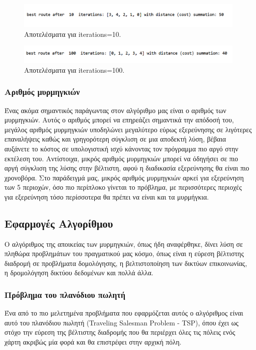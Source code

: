 \begin{figure}
    \centering
    \includegraphics[scale=0.55]{2947_thesis/pictures/ex5.png} 
    \caption{Αποτελέσματα για iterations=10.}
    \label{iter10}

\end{figure}
\begin{figure}
    \centering
    \includegraphics[scale=0.55]{2947_thesis/pictures/ex6.png} 
    \caption{Αποτελέσματα για iterations=100.}
    \label{iter100}
\end{figure}


\subsubsection{Αριθμός μυρμηγκιών}
Ένας ακόμα σημαντικός παράγωντας στον αλγόριθμο μας είναι ο αριθμός των μυρμηγκιών. Αυτός ο αριθμός μπορεί να επηρεάζει σημαντικά την απόδοσή του, μεγάλος αριθμός μυρμηγκιών υποδηλώνει μεγαλύτερο εύρως εξερεύνησης σε λιγότερες επαναλήψεις καθώς και γρηγορότερη σύγκλιση σε μια αποδεκτή λύση, βέβαια αυξάνετε το κόστος σε υπολογιστική ισχύ κάνοντας τον πρόγραμμα πιο αργό στην εκτέλεση του. Αντίστοιχα, μικρός αριθμός μυρμηγκιών μπορεί να όδηγήσει σε πιο αργή σύγκλιση της λύσης στην βέλτιστη, αφού η διαδικασία εξερεύνησης θα είναι πιο χρονοβόρα. Στο παράδειγμά μας, μικρός αριθμός μυρμηγκιών αρκεί για εξερεύνηση των 5 περιοχών, όσο πιο περίπλοκο γίνεται το πρόβλημα, με περισσότερες περιοχές για εξερεύνηση τόσο περίσσοτερα θα πρέπει να είναι και τα μυρμήγκια. 


\subsection{Εφαρμογές Αλγορίθμου}
Ο αλγόριθμος της αποικείας των μυρμηγκιών, όπως ήδη αναφέρθηκε, δίνει λύση σε πληθώρα προβλημάτων του πραγματικού μας κόσμο, όπως είναι η εύρεση βέλτιστης διαδρομή σε προβλήματα δομολόγησης, η βελτιστοποίηση των δικτύων επικοινωνίας, η δρομολόγηση δικτύου δεδομένων και πολλά άλλα. 

\subsubsection{Πρόβλημα του πλανόδιου πωλητή}
Ένα από το πιο μελετημένα προβλήματα που εφαρμόζεται αυτός ο αλγόριθμος είναι αυτό του πλανόδιου πωλητή (Traveling Salesman Problem - TSP), όπου έχει ως στόχο την εύρεση της βέλτιστης διαδρομής που θα περιέρχει όλες τις πόλεις ενός χάρτη ακριβώς μία φορά και θα επιστρέφει στην αρχική πόλη. 

